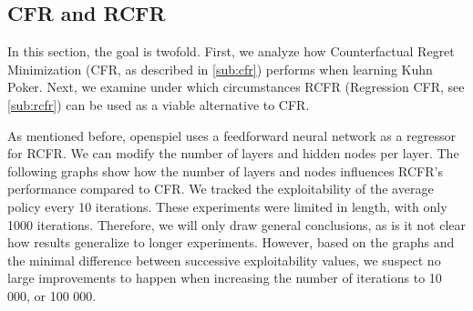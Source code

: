 \documentclass[10pt,a4paper]{article}
\begin{document}
\subsection{CFR and RCFR}
In this section, the goal is twofold. First, we analyze how Counterfactual Regret Minimization (CFR, as described in \ref{sub:cfr}) performs when learning Kuhn Poker. Next, we examine under which circumstances RCFR (Regression CFR, see \ref{sub:rcfr}) can be used as a viable alternative to CFR.

As mentioned before, openspiel uses a feedforward neural network as a regressor for RCFR. We can modify the number of layers and hidden nodes per layer. The following graphs show how the number of layers and nodes influences RCFR's performance compared to CFR. We tracked the exploitability of the average policy every 10 iterations. These experiments were limited in length, with only 1000 iterations. Therefore, we will only draw general conclusions, as is it not clear how results generalize to longer experiments. However, based on the graphs and the minimal difference between successive exploitability values, we suspect no large improvements to happen when increasing the number of iterations to 10 000, or 100 000.
 
\end{document}
